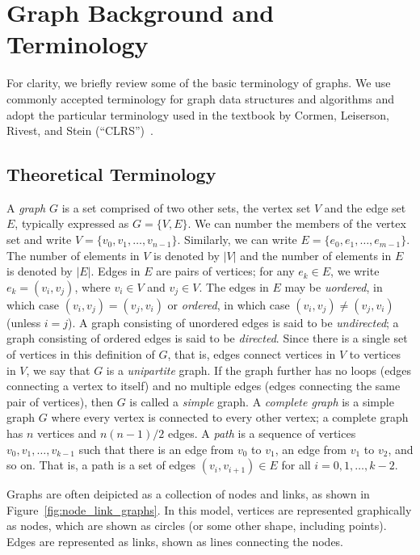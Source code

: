 \section{Graph Background and Terminology}

For clarity, we briefly review some of the basic terminology of graphs.
We use commonly accepted terminology for graph data structures and algorithms and
adopt the particular terminology used in the textbook by
Cormen, Leiserson, Rivest, and Stein (``CLRS'')~\cite{CLRS2022}.

\subsection{Theoretical Terminology}

A \emph{graph} $G$ is a set comprised of two other sets, the vertex set $V$ and the edge set $E$,
typically expressed as $G=\{V,E\}$. We can number the members of the vertex set
and write $V = \{ v_0, v_1, \ldots , v_{n-1} \}$. Similarly, we can write $E = \{ e_0, e_1, \ldots, e_{m-1} \}$. The number of elements in $V$ is denoted by $|V|$ and the number of elements in $E$ is denoted by $|E|$. Edges in $E$ are pairs of vertices; for any $e_k \in E$, we write $e_k = ( v_i, v_j )$, where $v_i \in V$ and $v_j\in V$. The edges in $E$ may be \emph{uordered}, in which case $(v_i, v_j) = (v_j, v_i)$ or \emph{ordered}, in which case $(v_i, v_j) \neq (v_j, v_i)$ (unless $i = j$).
A graph consisting of unordered edges is said to be \emph{undirected};
a graph consisting of ordered edges is said to be \emph{directed}.
Since there is a single set of vertices in this definition of $G$, that is, edges connect
vertices in $V$ to vertices in $V$, we say that
$G$ is a \emph{unipartite} graph.
If the graph further has no loops (edges connecting a vertex to itself)
and no multiple edges (edges connecting the same pair of vertices),
then $G$ is called a \emph{simple} graph.
A \emph{complete graph} is a simple graph $G$ where every vertex is connected
to every other vertex; a complete graph has
$n$ vertices and $n(n-1)/2$ edges.
A \emph{path} is a sequence of vertices $v_0, v_1, \ldots, v_{k-1}$ such that
there is an edge from $v_0$ to $v_1$, an edge from $v_1$ to $v_2$, and so on.
That is, a path is a set of edges $(v_i, v_{i+1}) \in E$ for all $i = 0, 1, \ldots, k-2$.

Graphs are often deipicted as a collection of nodes and links, as shown in
Figure~\ref{fig:node_link_graphs}. In this model, vertices are
represented graphically as nodes, which are
shown as circles (or some other shape, including points). Edges are represented as links,
shown as lines connecting the nodes.


